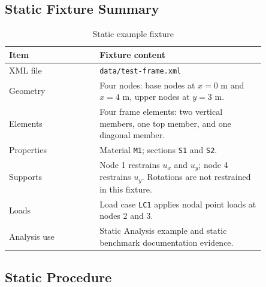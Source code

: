 \documentclass[11pt,a4paper]{article}
\begin{document}
\subsection{Static Fixture Summary}

\begin{table}[htbp]
\centering
\caption{Static example fixture}
\begin{tabular}{p{0.30\linewidth}p{0.55\linewidth}}
\toprule
Item & Fixture content \\
\midrule
XML file & \texttt{data/test-frame.xml} \\
Geometry & Four nodes: base nodes at \(x=0\) m and \(x=4\) m, upper nodes at \(y=3\) m. \\
Elements & Four frame elements: two vertical members, one top member, and one diagonal member. \\
Properties & Material \texttt{M1}; sections \texttt{S1} and \texttt{S2}. \\
Supports & Node 1 restrains \(u_x\) and \(u_y\); node 4 restrains \(u_y\). Rotations are not restrained in this fixture. \\
Loads & Load case \texttt{LC1} applies nodal point loads at nodes 2 and 3. \\
Analysis use & Static Analysis example and static benchmark documentation evidence. \\
\bottomrule
\end{tabular}
\end{table}

\subsection{Static Procedure}
\end{document}
